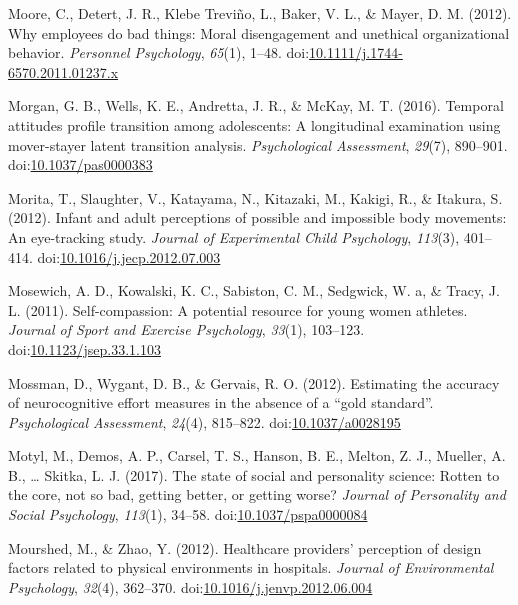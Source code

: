 \documentclass[english,man]{apa6}
\theoremstyle{definition}
\theoremstyle{definition}
\theoremstyle{definition}
\theoremstyle{remark}
\begin{document}
\hypertarget{ref-Moore2012}{}
Moore, C., Detert, J. R., Klebe Treviño, L., Baker, V. L., \& Mayer, D.
M. (2012). Why employees do bad things: Moral disengagement and
unethical organizational behavior. \emph{Personnel Psychology},
\emph{65}(1), 1--48.
doi:\href{https://doi.org/10.1111/j.1744-6570.2011.01237.x}{10.1111/j.1744-6570.2011.01237.x}

\hypertarget{ref-Morgan2016}{}
Morgan, G. B., Wells, K. E., Andretta, J. R., \& McKay, M. T. (2016).
Temporal attitudes profile transition among adolescents: A longitudinal
examination using mover-stayer latent transition analysis.
\emph{Psychological Assessment}, \emph{29}(7), 890--901.
doi:\href{https://doi.org/10.1037/pas0000383}{10.1037/pas0000383}

\hypertarget{ref-Morita2012}{}
Morita, T., Slaughter, V., Katayama, N., Kitazaki, M., Kakigi, R., \&
Itakura, S. (2012). Infant and adult perceptions of possible and
impossible body movements: An eye-tracking study. \emph{Journal of
Experimental Child Psychology}, \emph{113}(3), 401--414.
doi:\href{https://doi.org/10.1016/j.jecp.2012.07.003}{10.1016/j.jecp.2012.07.003}

\hypertarget{ref-Mosewich2011}{}
Mosewich, A. D., Kowalski, K. C., Sabiston, C. M., Sedgwick, W. a, \&
Tracy, J. L. (2011). Self-compassion: A potential resource for young
women athletes. \emph{Journal of Sport and Exercise Psychology},
\emph{33}(1), 103--123.
doi:\href{https://doi.org/10.1123/jsep.33.1.103}{10.1123/jsep.33.1.103}

\hypertarget{ref-Mossman2012}{}
Mossman, D., Wygant, D. B., \& Gervais, R. O. (2012). Estimating the
accuracy of neurocognitive effort measures in the absence of a ``gold
standard''. \emph{Psychological Assessment}, \emph{24}(4), 815--822.
doi:\href{https://doi.org/10.1037/a0028195}{10.1037/a0028195}

\hypertarget{ref-Motyl2017}{}
Motyl, M., Demos, A. P., Carsel, T. S., Hanson, B. E., Melton, Z. J.,
Mueller, A. B., \ldots{} Skitka, L. J. (2017). The state of social and
personality science: Rotten to the core, not so bad, getting better, or
getting worse? \emph{Journal of Personality and Social Psychology},
\emph{113}(1), 34--58.
doi:\href{https://doi.org/10.1037/pspa0000084}{10.1037/pspa0000084}

\hypertarget{ref-Mourshed2012}{}
Mourshed, M., \& Zhao, Y. (2012). Healthcare providers' perception of
design factors related to physical environments in hospitals.
\emph{Journal of Environmental Psychology}, \emph{32}(4), 362--370.
doi:\href{https://doi.org/10.1016/j.jenvp.2012.06.004}{10.1016/j.jenvp.2012.06.004}
\end{document}
